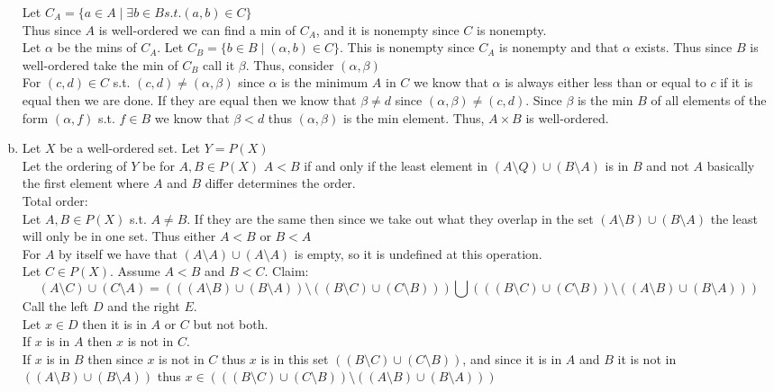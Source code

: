 \documentclass[12pt, letterpaper]{article}
\theoremstyle{definition}
\begin{document}
\begin{enumerate}[(a)]
    Let $C_A=\{a \in A \mid \exists b \in B s.t. (a,b) \in C\}$\\
    Thus since $A$ is well-ordered we can find a min of $C_A$, and it is nonempty since $C$ is nonempty.\\
    Let $\alpha$ be the mins of $C_A$. Let $C_B=\{b \in B \mid (\alpha,b) \in C\}$. This is nonempty since $C_A$ is nonempty and that $\alpha$ exists. Thus since $B$ is well-ordered take the min of $C_B$ call it $\beta$. Thus, consider $(\alpha,\beta)$\\
    For $(c,d) \in C$ s.t. $(c,d) \neq (\alpha, \beta)$ since $\alpha$ is the minimum $A$ in $C$ we know that $\alpha$ is always either less than or equal to $c$ if it is equal then we are done. If they are equal then we know that $\beta\neq d$ since $(\alpha,\beta) \neq (c,d)$. Since $\beta$ is the min $B$ of all 
    elements of the form $(\alpha,f)$ s.t. $f \in B$ we know that $\beta < d$ thus $(\alpha,\beta)$ is the min element. Thus, $A \times B$ is well-ordered.
    \item Let $X$ be a well-ordered set. Let $Y=P(X)$\\
    Let the ordering of $Y$ be for $A,B \in P(X)$ $A<B$ if and only if the least element in $(A \setminus Q) \cup (B \setminus A)$ is in $B$ and not $A$ basically the first element where $A$ and $B$ differ determines the order.\\
    Total order:\\
    Let $A,B \in P(X)$ s.t. $A \neq B$. If they are the same then since we take out what they overlap in the set $(A \setminus B) \cup (B \setminus A)$ the least will only be in one set. Thus either $A<B$ or $B<A$\\
    For $A$ by itself we have that $(A \setminus A) \cup (A \setminus A)$ is empty, so it is undefined at this operation.\\
    Let $C \in P(X)$. Assume $A<B$ and $B<C$. Claim:
    \[(A \setminus C) \cup (C \setminus A)=(((A \setminus B) \cup (B \setminus A)) \setminus ((B \setminus C) \cup (C \setminus B))) \bigcup (((B \setminus C) \cup (C \setminus B)) \setminus ((A \setminus B) \cup (B \setminus A)))\]
    Call the left $D$ and the right $E$.\\
    Let $x \in D$ then it is in $A$ or $C$ but not both.\\
    If $x$ is in $A$ then $x$ is not in $C$.\\
    If $x$ is in $B$ then since $x$ is not in $C$ thus $x$ is in this set $((B \setminus C) \cup (C \setminus B))$, and since it is in $A$ and $B$ it is not in $((A \setminus B) \cup (B \setminus A))$ thus $x \in (((B \setminus C) \cup (C \setminus B)) \setminus ((A \setminus B) \cup (B \setminus A)))$\\

\end{enumerate}
\end{document}
